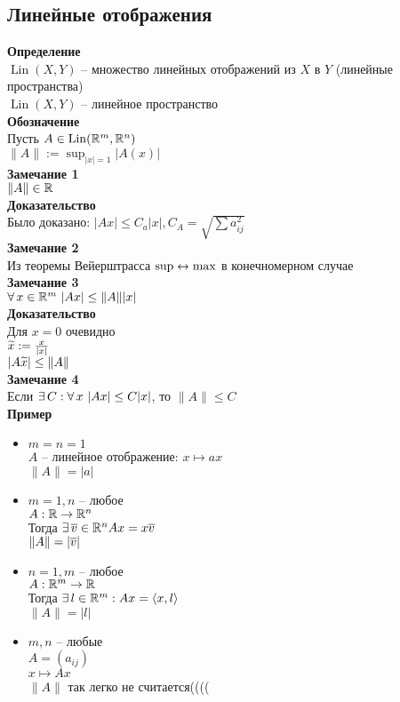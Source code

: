 \documentclass[12pt]{article}
\DeclareMathOperator{\Lin}{Lin}
\begin{document}
\subsection{Линейные отображения}
\textbf{Определение}\\
$\Lin(X, Y)$ -- множество линейных отображений из $X$ в $Y$ (линейные пространства)\\
$\Lin(X, Y)$ -- линейное пространство\\
\textbf{Обозначение}\\
Пусть $A \in \Lin(\Rset^m, \Rset^n)$\\
$\|A\| := \sup_{|x| = 1} |A(x)|$\\
\textbf{Замечание 1}\\
$\|A\| \in \mathbb{R}$\\
\textbf{Доказательство}\\
Было доказано: $|Ax| \leq C_a |x|, C_A = \sqrt{\sum a_{ij}^2}$\\
\textbf{Замечание 2}\\
Из теоремы Вейерштрасса $\sup \leftrightarrow \max$ в конечномерном случае\\
\textbf{Замечание 3}\\
$\forall\, x \in \mathbb{R}^m\ |Ax| \leq \|A\||x|$\\
\textbf{Доказательство}\\
Для $x=0$ очевидно\\
$\widetilde{x} := \frac{x}{|x|}$\\
$|A\widetilde{x}| \leq \|A\|$\\
\textbf{Замечание 4}\\
Если $\exists\, C: \forall\, x\ |Ax| \leq C|x|$, то $\|A\| \leq C$\\
\textbf{Пример}
\begin{itemize}
    \item $m=n=1$\\
    $A$ -- линейное отображение: $x \mapsto ax$\\
    $\|A\| = |a|$
    \item $m=1, n$ -- любое\\
    $A:\mathbb{R}\rightarrow \mathbb{R}^n$\\
    Тогда $\exists\, \overline v \in \mathbb{R}^n Ax = x\overline{v}$\\
    $\|A\| = |\overline v|$
    \item $n=1, m$ -- любое\\
    $A: \mathbb{R}^m \rightarrow \mathbb{R}$\\
    Тогда $\exists\, l \in \mathbb{R}^m: Ax=\langle x, l \rangle$\\
    $\|A\| = |l|$
    \item $m,n$ -- любые\\
    $A=(a_{ij})$\\
    $x \mapsto Ax$\\
    $\|A\|$ так легко не считается((((
\end{itemize}
\end{document}
